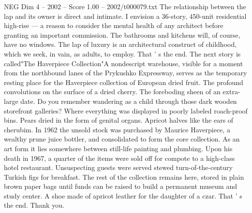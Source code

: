 \begin{textsample}{NEG Dim 4 – 2002 – Score 1.00 – 2002/t000079.txt}
The relationship between the lap and its owner is direct and intimate.
I envision a 36-story, 450-unit residential high-rise — a reason to consider the mental health of any architect before granting an important commission.
The bathrooms and kitchens will, of course, have no windows.
The lap of luxury is an architectural construct of childhood, which we seek, in vain, as adults, to employ.
That ' s the end.
The next story is called"The Haverpiece Collection"A nondescript warehouse, visible for a moment from the northbound lanes of the Prykushko Expressway, serves as the temporary resting place for the Haverpiece collection of European dried fruit.
The profound convolutions on the surface of a dried cherry.
The foreboding sheen of an extra-large date.
Do you remember wandering as a child through those dark wooden storefront galleries?
Where everything was displayed in poorly labeled roach-proof bins.
Pears dried in the form of genital organs.
Apricot halves like the ears of cherubim.
In 1962 the unsold stock was purchased by Maurice Haverpiece, a wealthy prune juice bottler, and consolidated to form the core collection.
As an art form it lies somewhere between still-life painting and plumbing.
Upon his death in 1967, a quarter of the items were sold off for compote to a high-class hotel restaurant.
Unsuspecting guests were served stewed turn-of-the-century Turkish figs for breakfast.
The rest of the collection remains here, stored in plain brown paper bags until funds can be raised to build a permanent museum and study center.
A shoe made of apricot leather for the daughter of a czar.
That ' s the end.
Thank you.

\end{textsample}
